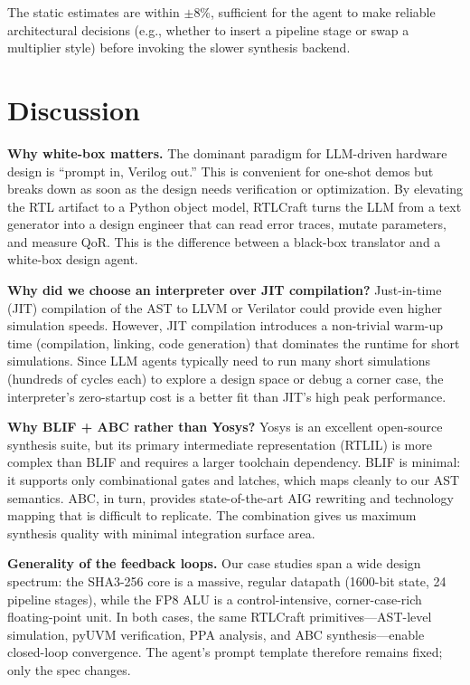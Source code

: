 \documentclass[11pt]{article}
\begin{document}
The static estimates are within $\pm$8\%, sufficient for the agent to make reliable architectural decisions (e.g., whether to insert a pipeline stage or swap a multiplier style) before invoking the slower synthesis backend.

\section{Discussion}
\label{sec:discussion}

\textbf{Why white-box matters.} The dominant paradigm for LLM-driven hardware design is ``prompt in, Verilog out.'' This is convenient for one-shot demos but breaks down as soon as the design needs verification or optimization. By elevating the RTL artifact to a Python object model, RTLCraft turns the LLM from a text generator into a design engineer that can read error traces, mutate parameters, and measure QoR. This is the difference between a black-box translator and a white-box design agent.

\textbf{Why did we choose an interpreter over JIT compilation?} Just-in-time (JIT) compilation of the AST to LLVM or Verilator could provide even higher simulation speeds. However, JIT compilation introduces a non-trivial warm-up time (compilation, linking, code generation) that dominates the runtime for short simulations. Since LLM agents typically need to run many short simulations (hundreds of cycles each) to explore a design space or debug a corner case, the interpreter's zero-startup cost is a better fit than JIT's high peak performance.

\textbf{Why BLIF + ABC rather than Yosys?} Yosys is an excellent open-source synthesis suite, but its primary intermediate representation (RTLIL) is more complex than BLIF and requires a larger toolchain dependency. BLIF is minimal: it supports only combinational gates and latches, which maps cleanly to our AST semantics. ABC, in turn, provides state-of-the-art AIG rewriting and technology mapping that is difficult to replicate. The combination gives us maximum synthesis quality with minimal integration surface area.

\textbf{Generality of the feedback loops.} Our case studies span a wide design spectrum: the SHA3-256 core is a massive, regular datapath (1600-bit state, 24 pipeline stages), while the FP8 ALU is a control-intensive, corner-case-rich floating-point unit. In both cases, the same RTLCraft primitives---AST-level simulation, pyUVM verification, PPA analysis, and ABC synthesis---enable closed-loop convergence. The agent's prompt template therefore remains fixed; only the spec changes.
\end{document}
